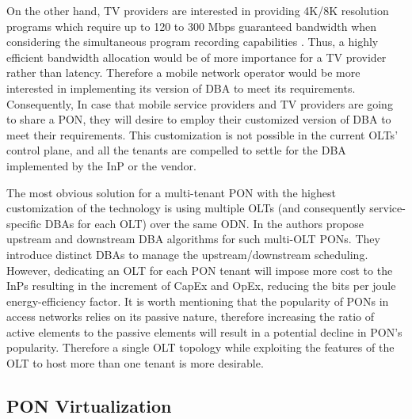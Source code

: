 On the other hand, TV providers are interested in providing 4K/8K resolution programs which require up to 120 to 300 Mbps guaranteed bandwidth when considering the simultaneous program recording capabilities \cite{7121687}. Thus, a highly efficient bandwidth allocation would be of more importance for a TV provider rather than latency. Therefore a mobile network operator would be more interested in implementing its version of \ac{DBA} to meet its requirements. Consequently, In case that mobile service providers and TV providers are going to share a \ac{PON}, they will desire to employ their customized version of \ac{DBA} to meet their requirements. This customization is not possible in the current \acp{OLT}' control plane, and all the tenants are compelled to settle for the \ac{DBA} implemented by the \ac{InP} or the vendor.

The most obvious solution for a multi-tenant \ac{PON} with the highest customization of the technology is using multiple \acp{OLT} (and consequently service-specific \acp{DBA} for each \ac{OLT}) over the same \ac{ODN}. In \cite{6261710} the authors propose upstream and downstream \ac{DBA} algorithms for such multi-\ac{OLT} \acp{PON}. They introduce distinct \acp{DBA} to manage the upstream/downstream scheduling. However, dedicating an \ac{OLT} for each \ac{PON} tenant will impose more cost to the \acp{InP} resulting in the increment of \ac{CapEx} and \ac{OpEx}, reducing the bits per joule energy-efficiency factor. It is worth mentioning that the popularity of \acp{PON} in access networks relies on its passive nature, therefore increasing the ratio of active elements to the passive elements will result in a potential decline in \ac{PON}'s popularity. Therefore a single \ac{OLT} topology while exploiting the features of the \ac{OLT} to host more than one tenant is more desirable.


\subsection{\ac{PON} Virtualization}

